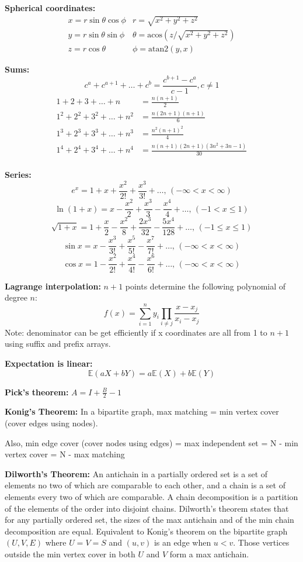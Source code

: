 \noindent
\textbf{Spherical coordinates:}
\[\begin{array}{cc}
x = r\sin\theta\cos\phi & r = \sqrt{x^2+y^2+z^2}\\
y = r\sin\theta\sin\phi & \theta = \textrm{acos}(z/\sqrt{x^2+y^2+z^2})\\
z = r\cos\theta & \phi = \textrm{atan2}(y,x)
\end{array}\]

\noindent
\textbf{Sums:}
\[ c^a + c^{a+1} + \dots + c^{b} = \frac{c^{b+1} - c^a}{c-1}, c \neq 1 \]
\begin{align*}
	1 + 2 + 3 + \dots + n &= \frac{n(n+1)}{2} \\
	1^2 + 2^2 + 3^2 + \dots + n^2 &= \frac{n(2n+1)(n+1)}{6} \\
	1^3 + 2^3 + 3^3 + \dots + n^3 &= \frac{n^2(n+1)^2}{4} \\
	1^4 + 2^4 + 3^4 + \dots + n^4 &= \frac{n(n+1)(2n+1)(3n^2 + 3n - 1)}{30} \\
\end{align*}

\noindent
\textbf{Series:}
$$e^x = 1+x+\frac{x^2}{2!}+\frac{x^3}{3!}+\dots,\,(-\infty<x<\infty)$$
$$\ln(1+x) = x-\frac{x^2}{2}+\frac{x^3}{3}-\frac{x^4}{4}+\dots,\,(-1<x\leq1)$$
$$\sqrt{1+x} = 1+\frac{x}{2}-\frac{x^2}{8}+\frac{2x^3}{32}-\frac{5x^4}{128}+\dots,\,(-1\leq x\leq1)$$
$$\sin x = x-\frac{x^3}{3!}+\frac{x^5}{5!}-\frac{x^7}{7!}+\dots,\,(-\infty<x<\infty)$$
$$\cos x = 1-\frac{x^2}{2!}+\frac{x^4}{4!}-\frac{x^6}{6!}+\dots,\,(-\infty<x<\infty)$$

\noindent
\textbf{Lagrange interpolation:} $n+1$ points determine the following polynomial of degree $n$:
\[ f(x)=\sum\limits_{i=1}^n y_i\prod _{i\neq j}\dfrac{x-x_j}{x_i-x_j} \]
Note: denominator can be get efficiently if x coordinates are all from 1 to $n+1$ using suffix and prefix arrays.

\noindent
\textbf{Expectation is linear:} \[\mathbb{E}(aX+bY) = a\mathbb{E}(X)+b\mathbb{E}(Y)\]

\noindent
\textbf{Pick's theorem:} $A=I+\frac{B}{2}-1$

\noindent
\textbf{Konig's Theorem:} In a bipartite graph, max matching = min vertex cover (cover edges using nodes).

\noindent
Also, min edge cover (cover nodes using edges) = max independent set = N - min vertex cover = N - max matching

\noindent
\textbf{Dilworth's Theorem:} An antichain in a partially ordered set is a set of elements no two of which are comparable to each other, and a chain is a set of elements every two of which are comparable. A chain decomposition is a partition of the elements of the order into disjoint chains. Dilworth's theorem states that for any partially ordered set, the sizes of the max antichain and of the min chain decomposition are equal. Equivalent to Konig's theorem on the bipartite graph $(U,V,E)$ where $U=V=S$ and $(u,v)$ is an edge when $u<v$. Those vertices outside the min vertex cover in both $U$ and $V$ form a max antichain.

